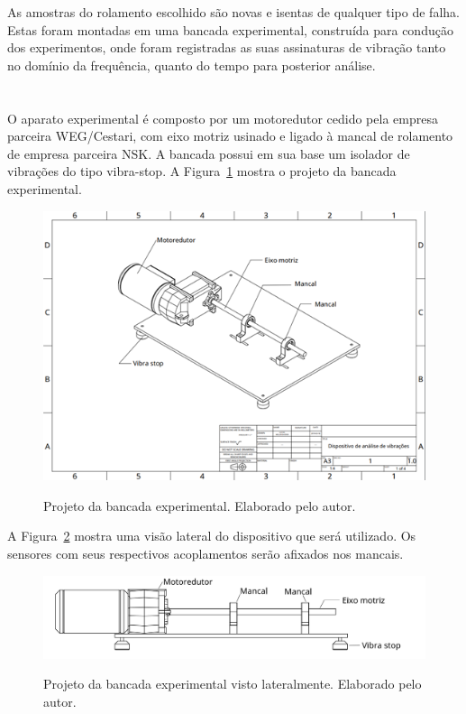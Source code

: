\documentclass[
	12pt,				
	oneside,			
	a4paper,			
	english,			
	brazil,			
	]{abntex2ppgsi}
\begin{document}
As amostras do rolamento escolhido são novas e isentas de qualquer tipo de falha. Estas foram montadas em uma bancada experimental, construída para condução dos experimentos, onde foram registradas as suas assinaturas de vibração tanto no domínio da frequência, quanto do tempo para posterior análise. 

\section{}

O aparato experimental é composto por um motoredutor cedido pela empresa parceira WEG/Cestari, com eixo motriz usinado e ligado à mancal de rolamento de empresa parceira NSK. A bancada possui em sua base um isolador de vibrações do tipo vibra-stop. A Figura~\ref{Figura22} mostra o projeto da bancada experimental. 

\begin{figure}[H]
\centering
\caption {Projeto da bancada experimental. Elaborado pelo autor.}
\includegraphics[width=\textwidth,height=\textheight,keepaspectratio]{Figura22}
\label{Figura22}
\end{figure}

A Figura~\ref{dispositivo_teste_visto_de_lado} mostra uma visão lateral do dispositivo que será utilizado. Os sensores com seus respectivos acoplamentos serão afixados nos mancais. 

\begin{figure}[H]
\centering
\caption {Projeto da bancada experimental visto lateralmente. Elaborado pelo autor.}
\includegraphics[width=\textwidth,height=\textheight,keepaspectratio]{dispositivo_teste_visto_de_lado}
\label{dispositivo_teste_visto_de_lado}
\end{figure}
\end{document}
